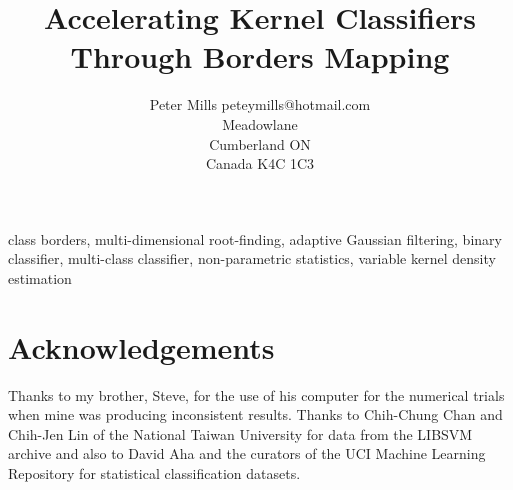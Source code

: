 \documentclass[twoside,11pt]{article}
\begin{document}
\title{Accelerating Kernel Classifiers Through Borders Mapping}

\author{\name Peter Mills
	\email peteymills@hotmail.com \\
        Meadowlane\\
       Cumberland ON\\
       Canada K4C 1C3}


\maketitle

\begin{abstract}%
	
\end{abstract}

\begin{keywords}
class borders,
multi-dimensional root-finding,
adaptive Gaussian filtering,
binary classifier,
multi-class classifier,
non-parametric statistics,
variable kernel density estimation
\end{keywords}



\newpage

\appendix



\section*{Acknowledgements}

Thanks to my brother, Steve, for the use of his computer for the numerical
trials when mine was producing inconsistent results.
Thanks to Chih-Chung Chan and Chih-Jen Lin of the National Taiwan University
for data from the LIBSVM archive and also to David Aha and the curators of
the UCI Machine Learning Repository for statistical classification datasets.

\vskip 0.2in

\end{document}
